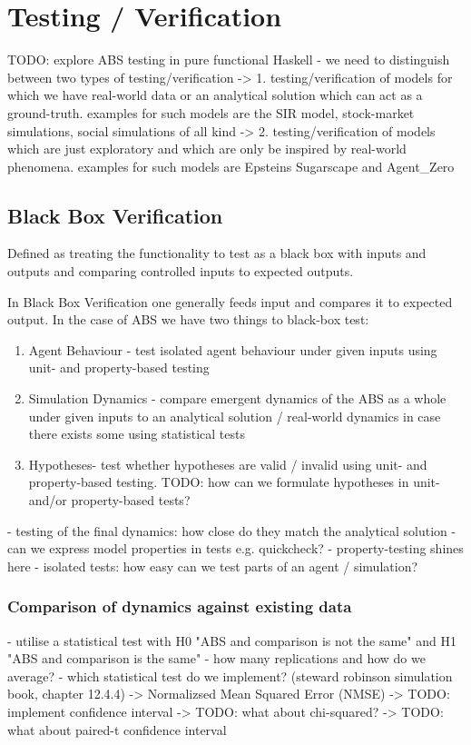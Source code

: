 \section{Testing / Verification}
TODO: explore ABS testing in pure functional Haskell
- we need to distinguish between two types of testing/verification
	-> 1. testing/verification of models for which we have real-world data or an analytical solution which can act as a ground-truth. examples for such models are the SIR model, stock-market simulations, social simulations of all kind
	-> 2. testing/verification of models which are just exploratory and which are only be inspired by real-world phenomena. examples for such models are Epsteins Sugarscape and Agent\_Zero
	
\subsection{Black Box Verification}
Defined as treating the functionality to test as a black box with inputs and outputs and comparing controlled inputs to expected outputs.

In Black Box Verification one generally feeds input and compares it to expected output. In the case of ABS we have two things to black-box test:
\begin{enumerate}
	\item Agent Behaviour - test isolated agent behaviour under given inputs using unit- and property-based testing
	\item Simulation Dynamics - compare emergent dynamics of the ABS as a whole under given inputs to an analytical solution / real-world dynamics in case there exists some using statistical tests
	\item Hypotheses- test whether hypotheses are valid / invalid using unit- and property-based testing. TODO: how can we formulate hypotheses in unit- and/or property-based tests?
\end{enumerate}

- testing of the final dynamics: how close do they match the analytical solution
- can we express model properties in tests e.g. quickcheck?
- property-testing shines here
- isolated tests: how easy can we test parts of an agent / simulation?


\subsubsection{Comparison of dynamics against existing data}
- utilise a statistical test with H0 "ABS and comparison is not the same" and H1 "ABS and comparison is the same"
- how many replications and how do we average?
- which statistical test do we implement? (steward robinson simulation book, chapter 12.4.4)
	-> Normalizsed Mean Squared Error (NMSE)
	-> TODO: implement confidence interval 
	-> TODO: what about chi-squared?
	-> TODO: what about paired-t confidence interval

